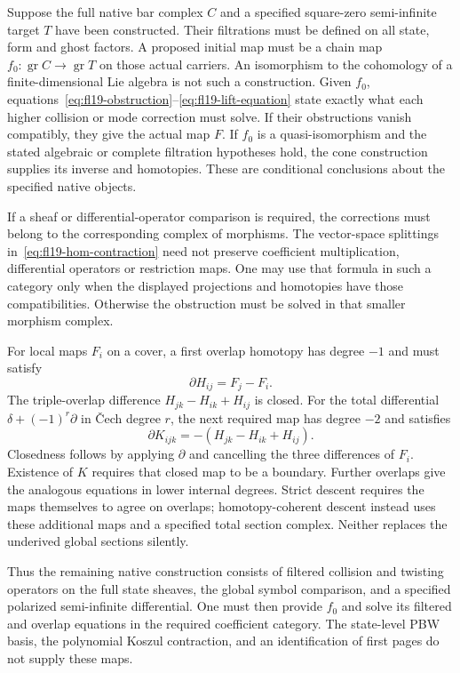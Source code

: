 Suppose the full native bar complex $C$ and a specified square-zero semi-infinite target $T$ have been constructed.
Their filtrations must be defined on all state, form and ghost factors.
A proposed initial map must be a chain map
$f_0:\operatorname{gr}C\to\operatorname{gr}T$ on those actual carriers.
An isomorphism to the cohomology of a finite-dimensional Lie algebra is not such a construction.
Given $f_0$, equations~\eqref{eq:fl19-obstruction}--\eqref{eq:fl19-lift-equation} state exactly what each higher collision or mode correction must solve.
If their obstructions vanish compatibly, they give the actual map $F$.
If $f_0$ is a quasi-isomorphism and the stated algebraic or complete filtration hypotheses hold, the cone construction supplies its inverse and homotopies.
These are conditional conclusions about the specified native objects.

If a sheaf or differential-operator comparison is required, the corrections must belong to the corresponding complex of morphisms.
The vector-space splittings in~\eqref{eq:fl19-hom-contraction} need not preserve coefficient multiplication, differential operators or restriction maps.
One may use that formula in such a category only when the displayed projections and homotopies have those compatibilities.
Otherwise the obstruction must be solved in that smaller morphism complex.

For local maps $F_i$ on a cover, a first overlap homotopy has degree $-1$ and must satisfy
\[
\partial H_{ij}=F_j-F_i.
\]
The triple-overlap difference $H_{jk}-H_{ik}+H_{ij}$ is closed.
For the total differential $\delta+(-1)^r\partial$ in \v Cech degree $r$, the next required map has degree $-2$ and satisfies
\[
\partial K_{ijk}=-(H_{jk}-H_{ik}+H_{ij}).
\]
Closedness follows by applying $\partial$ and cancelling the three differences of $F_i$.
Existence of $K$ requires that closed map to be a boundary.
Further overlaps give the analogous equations in lower internal degrees.
Strict descent requires the maps themselves to agree on overlaps; homotopy-coherent descent instead uses these additional maps and a specified total section complex.
Neither replaces the underived global sections silently.

Thus the remaining native construction consists of filtered collision and twisting operators on the full state sheaves, the global symbol comparison, and a specified polarized semi-infinite differential.
One must then provide $f_0$ and solve its filtered and overlap equations in the required coefficient category.
The state-level PBW basis, the polynomial Koszul contraction, and an identification of first pages do not supply these maps.
